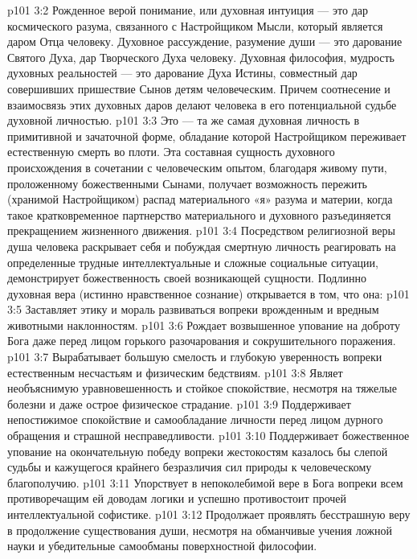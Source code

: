 \vs p101 3:2 Рожденное верой понимание, или духовная интуиция --- это дар космического разума, связанного с Настройщиком Мысли, который является даром Отца человеку. Духовное рассуждение, разумение души --- это дарование Святого Духа, дар Творческого Духа человеку. Духовная философия, мудрость духовных реальностей --- это дарование Духа Истины, совместный дар совершивших пришествие Сынов детям человеческим. Причем соотнесение и взаимосвязь этих духовных даров делают человека в его потенциальной судьбе духовной личностью.
\vs p101 3:3 Это --- та же самая духовная личность в примитивной и зачаточной форме, обладание которой Настройщиком переживает естественную смерть во плоти. Эта составная сущность духовного происхождения в сочетании с человеческим опытом, благодаря живому пути, проложенному божественными Сынами, получает возможность пережить (хранимой Настройщиком) распад материального «я» разума и материи, когда такое кратковременное партнерство материального и духовного разъединяется прекращением жизненного движения.
\vs p101 3:4 Посредством религиозной веры душа человека раскрывает себя и побуждая смертную личность реагировать на определенные трудные интеллектуальные и сложные социальные ситуации, демонстрирует божественность своей возникающей сущности. Подлинно духовная вера (истинно нравственное сознание) открывается в том, что она:
\vs p101 3:5 \bibnobreakspace Заставляет этику и мораль развиваться вопреки врожденным и вредным животными наклонностям.
\vs p101 3:6 \bibnobreakspace Рождает возвышенное упование на доброту Бога даже перед лицом горького разочарования и сокрушительного поражения.
\vs p101 3:7 \bibnobreakspace Вырабатывает большую смелость и глубокую уверенность вопреки естественным несчастьям и физическим бедствиям.
\vs p101 3:8 \bibnobreakspace Являет необъяснимую уравновешенность и стойкое спокойствие, несмотря на тяжелые болезни и даже острое физическое страдание.
\vs p101 3:9 \bibnobreakspace Поддерживает непостижимое спокойствие и самообладание личности перед лицом дурного обращения и страшной несправедливости.
\vs p101 3:10 \bibnobreakspace Поддерживает божественное упование на окончательную победу вопреки жестокостям казалось бы слепой судьбы и кажущегося крайнего безразличия сил природы к человеческому благополучию.
\vs p101 3:11 \bibnobreakspace Упорствует в непоколебимой вере в Бога вопреки всем противоречащим ей доводам логики и успешно противостоит прочей интеллектуальной софистике.
\vs p101 3:12 \bibnobreakspace Продолжает проявлять бесстрашную веру в продолжение существования души, несмотря на обманчивые учения ложной науки и убедительные самообманы поверхностной философии.
